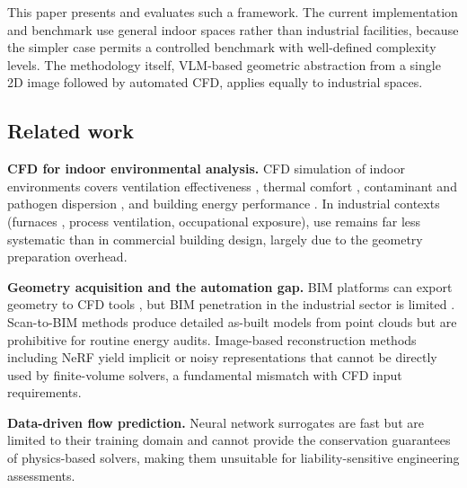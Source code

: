 \documentclass[preprint,12pt,number]{elsarticle}
\begin{document}
This paper presents and evaluates such a framework. The current implementation and benchmark use general indoor spaces rather than industrial facilities, because the simpler case permits a controlled benchmark with well-defined complexity levels. The methodology itself, VLM-based geometric abstraction from a single 2D image followed by automated CFD, applies equally to industrial spaces.

\subsection{Related work}
\label{sec:related-work}


\textbf{CFD for indoor environmental analysis.} CFD simulation of indoor environments covers ventilation effectiveness \cite{kosutova.etal2019CrossventilationGeneric,liu.etal2019ReviewCFD}, thermal comfort \cite{chen.etal2021UnsteadystateCFD}, contaminant and pathogen dispersion \cite{vuorinen.etal2020ModellingAerosol,liu.etal2021SimulationbasedStudy,srivastava.etal2021EffectiveVentilation}, and building energy performance \cite{brozovsky.etal2022AssessingImpact,ren.cao2019DevelopmentApplication}. In industrial contexts (furnaces \cite{zhao.etal2021IndustrialReheating}, process ventilation, occupational exposure), use remains far less systematic than in commercial building design, largely due to the geometry preparation overhead.

\textbf{Geometry acquisition and the automation gap.} BIM platforms can export geometry to CFD tools \cite{utkucu.sozer2020InteroperabilityData,hou.etal2022PredictionOptimization}, but BIM penetration in the industrial sector is limited \cite{gourlis.kovacic2017BuildingInformation}. Scan-to-BIM methods \cite{rocha.etal2020ScantoBIMMethodology,wang.etal2019ApplicationOriented} produce detailed as-built models from point clouds but are prohibitive for routine energy audits. Image-based reconstruction methods including NeRF \cite{mildenhall.etal2020NeRFRepresenting} yield implicit or noisy representations that cannot be directly used by finite-volume solvers, a fundamental mismatch with CFD input requirements.

\textbf{Data-driven flow prediction.} Neural network surrogates \cite{guo.etal2016ConvolutionalNeural,calzolari.liu2021DeepLearning,kastner.dogan2023GANBasedSurrogate} are fast but are limited to their training domain and cannot provide the conservation guarantees of physics-based solvers, making them unsuitable for liability-sensitive engineering assessments.
\end{document}

